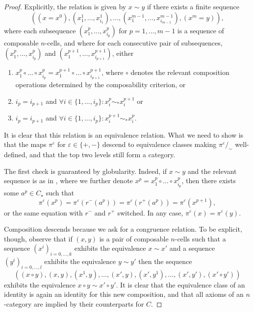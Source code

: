 \documentclass[12pt,a4paper]{article}
\numberwithin{equation}{section}
\begin{document}
\begin{proof}
    Explicitly, the relation is given by $x \sim y$ if there exists a finite sequence
    \begin{equation}\label{eq:sequence_for_relation}
        \left( (x = x^0), (x^1_{1}, \dots, x^1_{i_1}), \dots, (x^{m-1}_{1}, \dots, x^{m-1}_{i_{m-1}}), (x^m = y) \right),
    \end{equation}
    where each subsequence $(x^p_{1}, \dots, x^p_{i_p})$ for $p=1, \dots, m-1$ is a sequence of composable $n$-cells, and where for each consecutive pair of subsequences, $(x^p_{1}, \dots, x^p_{i_p})$ and $(x^{p+1}_{1}, \dots, x^{p+1}_{i_{p+1}})$, either
    \begin{enumerate}
        \item $x^p_1 \circ \dots \circ x^p_{i_p} = x^{p+1}_{1} \circ \dots \circ x^{p+1}_{i_{p+1}}$, where $\circ$ denotes the relevant composition operations determined by the composability criterion, or
        \item $i_p = i_{p+1}$ and $\forall i \in \{1, \dots, i_p\}: x^p_i \sim_* x^{p+1}_i$ or
        \item $i_p = i_{p+1}$ and $\forall i \in \{1, \dots, i_p\}: x^{p+1}_i \sim_* x^p_i$.
    \end{enumerate}

    It is clear that this relation is an equivalence relation. What we need to show is that the maps $\pi^{\varepsilon}$ for $\varepsilon \in \{ +, - \}$ descend to equivalence classes making $\pi^{\varepsilon}/_{\sim}$ well-defined, and that the top two levels still form a category.

    The first check is guaranteed by globularity. Indeed, if $x \sim y$ and the relevant sequence is as in , where we further denote $x^p = x^p_1 \circ \dots \circ x^p_{i_p}$,  then there exists some $a^p \in C_\star$ such that
    \begin{equation}
        \pi^{\varepsilon} (x^p) = \pi^{\varepsilon} (r^- (a^p)) = \pi^{\varepsilon} (r^+ (a^p)) = \pi^{\varepsilon} (x^{p+1}),    
    \end{equation}
    or the same equation with $r^-$ and $r^+$ switched. In any case, $\pi^{\varepsilon} (x) = \pi^{\varepsilon} (y)$.

    Composition descends because we ask for a congruence relation. To be explicit, though, observe that if $(x,y)$ is a pair of composable $n$-cells such that a sequence $(x^i)_{i=0,\dots,k}$ exhibits the equivalence $x \sim x'$ and a sequence $(y^i)_{i=0,\dots,l}$ exhibits the equivalence $y \sim y'$ then the sequence
    \begin{equation}
        \left( (x \circ y), (x, y), (x^1, y), \dots, (x', y), (x', y^1), \dots, (x', y'), (x' \circ y')\right)
    \end{equation}
    exhibits the equivalence $x \circ y \sim x' \circ y'$. It is clear that the equivalence class of an identity is again an identity for this new composition, and that all axioms of an $n$-category are implied by their counterparts for $C$.


\end{proof}
\end{document}
